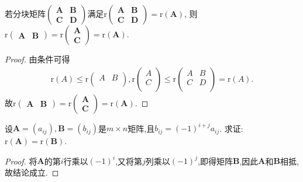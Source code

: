 \documentclass[../../main.tex]{subfiles}%
\begin{document}
\begin{corollary}\label{corollary:列分块与行分块秩等于其交叉块的秩}
若分块矩阵\(\begin{pmatrix}
\boldsymbol{A}&\boldsymbol{B}\\
\boldsymbol{C}&\boldsymbol{D}
\end{pmatrix}\)满足\(\mathrm{r}\begin{pmatrix}
\boldsymbol{A}&\boldsymbol{B}\\
\boldsymbol{C}&\boldsymbol{D}
\end{pmatrix}=\mathrm{r}(\boldsymbol{A})\), 则\(\mathrm{r}\begin{pmatrix}
\boldsymbol{A}&\boldsymbol{B}
\end{pmatrix}=\mathrm{r}\begin{pmatrix}
\boldsymbol{A}\\
\boldsymbol{C}
\end{pmatrix}=\mathrm{r}(\boldsymbol{A})\).
\end{corollary}
\begin{proof}

由条件可得
\begin{align*}
\mathrm{r}\left( A \right) \leqslant \mathrm{r}\left( \begin{matrix}
A&		B\\
\end{matrix} \right) ,\mathrm{r}\left( \begin{array}{c}
A\\
C\\
\end{array} \right) \leqslant \mathrm{r}\left( \begin{matrix}
A&		B\\
C&		D\\
\end{matrix} \right) =\mathrm{r}\left( A \right) .
\end{align*}
故\(\mathrm{r}\begin{pmatrix}
\boldsymbol{A}&\boldsymbol{B}
\end{pmatrix}=\mathrm{r}\begin{pmatrix}
\boldsymbol{A}\\
\boldsymbol{C}
\end{pmatrix}=\mathrm{r}(\boldsymbol{A})\).

\end{proof}

\begin{example}
设\(\boldsymbol{A}=(a_{ij}),\boldsymbol{B}=(b_{ij})\)是\(m\times n\)矩阵,且\(b_{ij}=(-1)^{i + j}a_{ij}\). 求证:\(\mathrm{r}(\boldsymbol{A})=\mathrm{r}(\boldsymbol{B})\).
\end{example}
\begin{proof}

将\(\boldsymbol{A}\)的第\(i\)行乘以\((-1)^i\),又将第\(j\)列乘以\((-1)^j\),即得矩阵\(\boldsymbol{B}\),因此\(\boldsymbol{A}\)和\(\boldsymbol{B}\)相抵,故结论成立. 

\end{proof}
\end{document}
